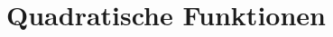 \documentclass
[
  draft    = true,
  fontsize = 10pt,
  parskip  = half-,
  BCOR     = 0pt,
  DIV      = 14,
  ngerman
]
{scrartcl}
\newlength{\measureboxdepth}
\newlength{\measureboxtotal}
\newcommand{\vstrut}[1][0pt]
{%
  \rule[-\measureboxdepth]{#1}{\measureboxtotal}%
}
\begin{document}

\newcommand{\colgap}{\qquad&\vstrut\qquad}%

\section*{Quadratische Funktionen}



\end{document}
